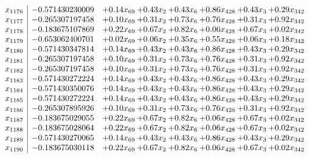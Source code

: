 \documentclass[8pt]{article}
\begin{document}
\[\begin{array}{c| c c@{\hskip 2pt} c@{\hskip 2pt} c@{\hskip 2pt} c@{\hskip 2pt} c@{\hskip 2pt} c@{\hskip 2pt} }
 x_{1176}   &  -0.571430230009 & +  0.14 x_{69} & +  0.43 x_{2} & +  0.43 x_{6} & +  0.86 x_{428} & +  0.43 x_{3} & +  0.29 x_{342}\\
 x_{1177}   &  -0.265307197458 & +  0.10 x_{69} & +  0.31 x_{2} & +  0.73 x_{6} & +  0.76 x_{428} & +  0.31 x_{3} & +  0.92 x_{342}\\
 x_{1178}   &  -0.183675107869 & +  0.22 x_{69} & +  0.67 x_{2} & +  0.82 x_{6} & +  0.06 x_{428} & +  0.67 x_{3} & +  0.02 x_{342}\\
 x_{1179}   &  -0.653062400701 & +  0.02 x_{69} & +  0.06 x_{2} & +  0.35 x_{6} & +  0.55 x_{428} & +  0.06 x_{3} & +  0.18 x_{342}\\
 x_{1180}   &  -0.571430347814 & +  0.14 x_{69} & +  0.43 x_{2} & +  0.43 x_{6} & +  0.86 x_{428} & +  0.43 x_{3} & +  0.29 x_{342}\\
 x_{1181}   &  -0.265307197458 & +  0.10 x_{69} & +  0.31 x_{2} & +  0.73 x_{6} & +  0.76 x_{428} & +  0.31 x_{3} & +  0.92 x_{342}\\
 x_{1182}   &  -0.265307197458 & +  0.10 x_{69} & +  0.31 x_{2} & +  0.73 x_{6} & +  0.76 x_{428} & +  0.31 x_{3} & +  0.92 x_{342}\\
 x_{1183}   &  -0.571430272224 & +  0.14 x_{69} & +  0.43 x_{2} & +  0.43 x_{6} & +  0.86 x_{428} & +  0.43 x_{3} & +  0.29 x_{342}\\
 x_{1184}   &  -0.571430350076 & +  0.14 x_{69} & +  0.43 x_{2} & +  0.43 x_{6} & +  0.86 x_{428} & +  0.43 x_{3} & +  0.29 x_{342}\\
 x_{1185}   &  -0.571430272224 & +  0.14 x_{69} & +  0.43 x_{2} & +  0.43 x_{6} & +  0.86 x_{428} & +  0.43 x_{3} & +  0.29 x_{342}\\
 x_{1186}   &  -0.265307895926 & +  0.10 x_{69} & +  0.31 x_{2} & +  0.73 x_{6} & +  0.76 x_{428} & +  0.31 x_{3} & +  0.92 x_{342}\\
 x_{1187}   &  -0.183675029055 & +  0.22 x_{69} & +  0.67 x_{2} & +  0.82 x_{6} & +  0.06 x_{428} & +  0.67 x_{3} & +  0.02 x_{342}\\
 x_{1188}   &  -0.183675028064 & +  0.22 x_{69} & +  0.67 x_{2} & +  0.82 x_{6} & +  0.06 x_{428} & +  0.67 x_{3} & +  0.02 x_{342}\\
 x_{1189}   &  -0.571430270065 & +  0.14 x_{69} & +  0.43 x_{2} & +  0.43 x_{6} & +  0.86 x_{428} & +  0.43 x_{3} & +  0.29 x_{342}\\
 x_{1190}   &  -0.183675030118 & +  0.22 x_{69} & +  0.67 x_{2} & +  0.82 x_{6} & +  0.06 x_{428} & +  0.67 x_{3} & +  0.02 x_{342}\\

\end{array}\]
\end{document}
